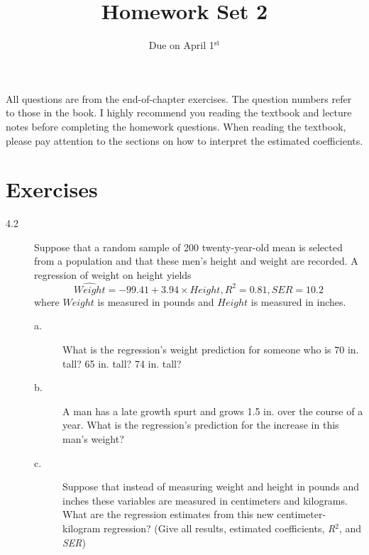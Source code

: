 \documentclass[a4paper,11pt]{article}
\date{Due on April 1\(^{\text{st}}\)}
\title{Homework Set 2}
\begin{document}
\maketitle
All questions are from the end-of-chapter exercises. The question
numbers refer to those in the book. I highly recommend you reading the
textbook and lecture notes before completing the homework
questions. When reading the textbook, please pay attention to the
sections on how to interpret the estimated coefficients.

\section*{Exercises}
\label{sec:orgc6220ca}

\begin{description}
\item[{4.2}] Suppose that a random sample of 200 twenty-year-old mean is
selected from a population and that these men's height and
weight are recorded. A regression of weight on height yields
\begin{equation*}
\widehat{Weight} = -99.41 + 3.94 \times Height, R^2 = 0.81, SER = 10.2
\end{equation*}
where \(Weight\) is measured in pounds and \(Height\) is measured
in inches.
\begin{description}
\item[{a.}] What is the regression's weight prediction for someone who
is 70 in. tall? 65 in. tall? 74 in. tall?
\item[{b.}] A man has a late growth spurt and grows 1.5 in. over the
course of a year. What is the regression's prediction for
the increase in this man's weight?
\item[{c.}] Suppose that instead of measuring weight and height in
pounds and inches these variables are measured in
centimeters and kilograms. What are the regression estimates
from this new centimeter-kilogram regression? (Give all
results, estimated coefficients, \emph{R\(^{\text{2}}\)}, and \emph{SER})
\end{description}
\end{description}

\vspace{0.5cm}
\end{document}
